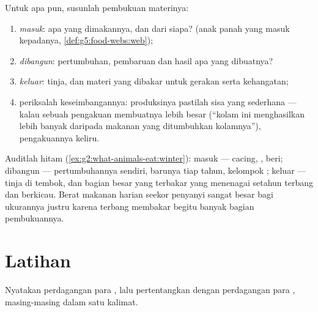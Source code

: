 \begin{method}\label{met:g6:matter-from-food:audit}
Untuk  apa pun, susunlah pembukuan materinya:
\begin{enumerate}
  \item \emph{masuk}:  apa yang dimakannya, dan dari
        siapa? (anak panah  yang masuk kepadanya,
        \cref{def:g5:food-webs:web});
  \item \emph{dibangun}: pertumbuhan, pembaruan dan hasil apa yang
        dibuatnya?
  \item \emph{keluar}: tinja, dan materi yang dibakar untuk gerakan
        serta kehangatan;
  \item periksalah keseimbangannya: produksinya pastilah sisa yang
        sederhana --- kalau sebuah pengakuan membuatnya lebih besar
        (``kolam ini menghasilkan  lebih banyak daripada
        makanan yang ditumbuhkan kolamnya''), pengakuannya keliru.
\end{enumerate}
\end{method}

\begin{example}\label{ex:g6:matter-from-food:audituse}
Auditlah  hitam (\cref{ex:g2:what-animals-eat:winter}): masuk
--- cacing, ,  beri; dibangun --- pertumbuhannya sendiri,
 barunya tiap tahun, kelompok ; keluar --- tinja di
tembok, dan bagian besar yang terbakar yang menenagai setahun terbang
dan berkicau. Berat makanan harian seekor  penyanyi sangat besar
bagi ukurannya justru karena terbang membakar begitu banyak bagian
pembukuannya.
\end{example}

\section{Latihan}

\begin{exercise}[$\star$]\label{exo:g6:matter-from-food:1}
Nyatakan perdagangan para , lalu pertentangkan dengan
perdagangan para , masing-masing dalam satu kalimat.
\end{exercise}

